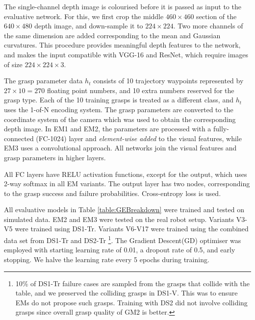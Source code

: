 The single-channel depth image is colourised before it is passed as input to the evaluative network. For this, we first crop the middle $460 \times 460$ section of the $640 \times 480$ depth image, and down-sample it to $224 \times 224$. Two more channels of the same dimension are added corresponding to the mean and Gaussian curvatures. %
This procedure provides meaningful depth features to the network, and makes the input compatible with VGG-16 and ResNet, which require images of size $224 \times 224 \times 3$.

The grasp parameter data $h_t$ consists of 10 trajectory waypoints represented by $27 \times 10 = 270$ floating point numbers, and 10 extra numbers reserved for the grasp type. Each of the 10 training grasps is treated as a different class, and $h_t$ uses the 1-of-N encoding system. The grasp parameters are converted to the coordinate system of the camera which was used to obtain the corresponding depth image. In EM1 and EM2, the parameters are processed with a fully-connected (FC-1024) layer and \textit{element-wise added} to the visual features, while EM3 uses a convolutional approach. All networks join the visual features and grasp parameters in higher layers.

All FC layers have RELU activation functions, except for the output, which uses 2-way softmax in all EM variants. The output layer has two nodes, corresponding to the grasp success and failure probabilities. Cross-entropy loss is used. %

All evaluative models in Table \ref{table:GEBreakdown} were trained and tested on simulated data. EM2 and EM3 were tested on the real robot setup. Variants V3-V5 were trained using DS1-Tr. Variants V6-V17 were trained using the combined data set from DS1-Tr and DS2-Tr \footnote{10\% of DS1-Tr failure cases are sampled from the grasps that collide with the table, and we preserved the colliding grasps in DS1-V. This was to ensure EMs do not propose such grasps. Training with DS2 did not involve colliding grasps since overall grasp quality of GM2 is better.}. The Gradient Descent(GD) optimiser was employed with starting learning rate of 0.01, a dropout rate of 0.5, and early stopping. We halve the learning rate every 5 epochs during training.


